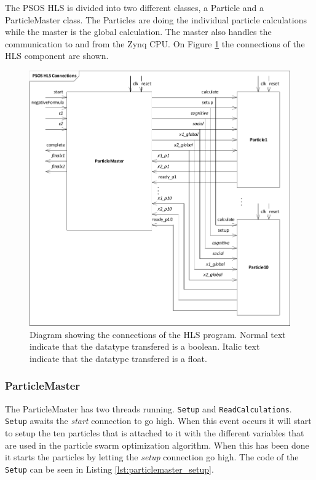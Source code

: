 The PSOS HLS is divided into two different classes, a Particle and a ParticleMaster class. The Particles are doing the individual particle calculations while the master is the global calculation. The master also handles the communication to and from the Zynq CPU. On Figure \ref{fig:psoshlsconnections} the connections of the HLS component are shown.\\

\begin{figure}[H]
	\centering
	\includegraphics[width=0.7\linewidth]{diagram/psos_hls_connections}
	\caption{Diagram showing the connections of the HLS program. Normal text indicate that the datatype transfered is a boolean. Italic text indicate that the datatype transfered is a float.}
	\label{fig:psoshlsconnections}
\end{figure}

\subsubsection{ParticleMaster}

The ParticleMaster has two threads running. \texttt{Setup} and \texttt{ReadCalculations}. \texttt{Setup} awaits the \textit{start} connection to go high. When this event occurs it will start to setup the ten particles that is attached to it with the different variables that are used in the particle swarm optimization algorithm. When this has been done it starts the particles by letting the \textit{setup} connection go high. The code of the \texttt{Setup} can be seen in Listing \ref{lst:particlemaster_setup}.\\

